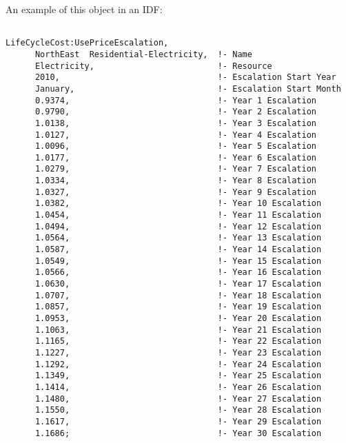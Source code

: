 An example of this object in an IDF:

\begin{lstlisting}

LifeCycleCost:UsePriceEscalation,
      NorthEast  Residential-Electricity,  !- Name
      Electricity,                         !- Resource
      2010,                                !- Escalation Start Year
      January,                             !- Escalation Start Month
      0.9374,                              !- Year 1 Escalation
      0.9790,                              !- Year 2 Escalation
      1.0138,                              !- Year 3 Escalation
      1.0127,                              !- Year 4 Escalation
      1.0096,                              !- Year 5 Escalation
      1.0177,                              !- Year 6 Escalation
      1.0279,                              !- Year 7 Escalation
      1.0334,                              !- Year 8 Escalation
      1.0327,                              !- Year 9 Escalation
      1.0382,                              !- Year 10 Escalation
      1.0454,                              !- Year 11 Escalation
      1.0494,                              !- Year 12 Escalation
      1.0564,                              !- Year 13 Escalation
      1.0587,                              !- Year 14 Escalation
      1.0549,                              !- Year 15 Escalation
      1.0566,                              !- Year 16 Escalation
      1.0630,                              !- Year 17 Escalation
      1.0707,                              !- Year 18 Escalation
      1.0857,                              !- Year 19 Escalation
      1.0953,                              !- Year 20 Escalation
      1.1063,                              !- Year 21 Escalation
      1.1165,                              !- Year 22 Escalation
      1.1227,                              !- Year 23 Escalation
      1.1292,                              !- Year 24 Escalation
      1.1349,                              !- Year 25 Escalation
      1.1414,                              !- Year 26 Escalation
      1.1480,                              !- Year 27 Escalation
      1.1550,                              !- Year 28 Escalation
      1.1617,                              !- Year 29 Escalation
      1.1686;                              !- Year 30 Escalation
\end{lstlisting}